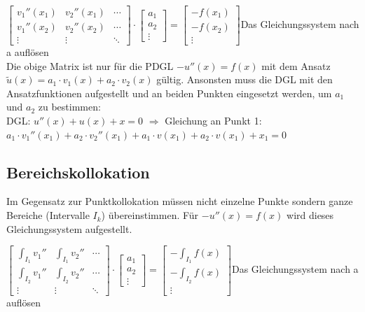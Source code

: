 $\begin{bmatrix}
	v_1''(x_1)& v_2''(x_1)&\cdots\\
	v_1''(x_2)& v_2''(x_2)&\cdots\\
	\vdots& \vdots&\ddots
\end{bmatrix}\cdot
\begin{bmatrix}
a_1\\
a_2\\
\vdots
\end{bmatrix}
=\begin{bmatrix}
-f(x_1)\\
-f(x_2)\\
\vdots
\end{bmatrix}$\qquad Das Gleichungssystem nach a auflösen\\

Die obige Matrix ist nur für die PDGL $-u''(x) = f(x)$ mit dem Ansatz
$\tilde{u}(x) = a_1 \cdot v_1(x) + a_2 \cdot v_2(x)$ gültig. Ansonsten muss die
DGL mit den Ansatzfunktionen aufgestellt und an beiden Punkten eingesetzt
werden, um $a_1$ und $a_2$ zu bestimmen:\\
DGL: $u''(x) + u(x) + x = 0$ $\Rightarrow$ Gleichung an Punkt 1: $a_1 \cdot
v_1''(x_1) + a_2 \cdot v_2''(x_1) + a_1 \cdot v(x_1) + a_2 \cdot v(x_1) + x_1 =
0$




\subsection{Bereichskollokation}
Im Gegensatz zur Punktkollokation müssen nicht einzelne Punkte sondern ganze Bereiche (Intervalle $I_k$) übereinstimmen. Für $-u''(x) = f(x)$ wird dieses Gleichungssystem aufgestellt.

$\begin{bmatrix}
	\int_{I_1} v_1'' & \int_{I_1} v_2''& \cdots\\
	\int_{I_2} v_1'' & \int_{I_2} v_2''& \cdots\\
	\vdots& \vdots&\ddots
\end{bmatrix}\cdot
\begin{bmatrix}
a_1\\
a_2\\
\vdots
\end{bmatrix}
=\begin{bmatrix}
-\int_{I_1} f(x)\\
-\int_{I_2} f(x)\\
\vdots
\end{bmatrix}$\qquad Das Gleichungssystem nach a auflösen


